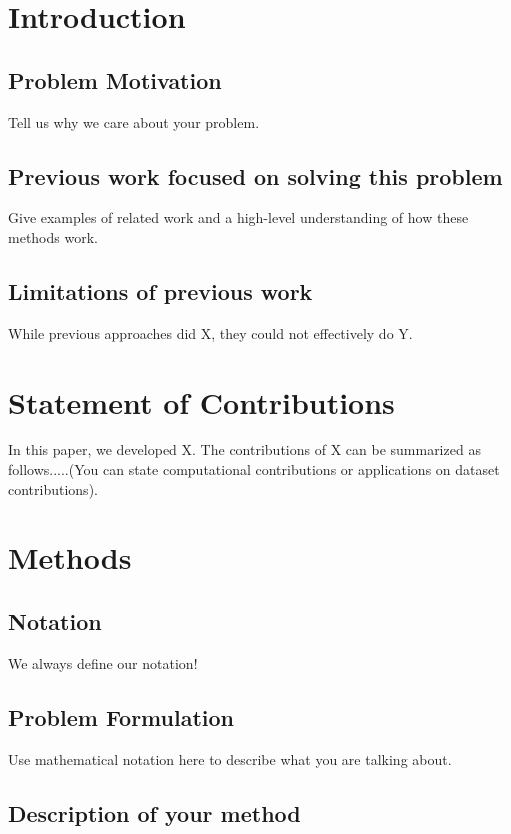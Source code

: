\documentclass{article}
\begin{document}
\section{Introduction}

\subsection{Problem Motivation}

Tell us why we care about your problem. 

\subsection{Previous work focused on solving this problem}

Give examples of related work and a high-level understanding of how these methods work.

\subsection{Limitations of previous work}

While previous approaches did X, they could not effectively do Y. 

\section{Statement of Contributions}

In this paper, we developed X. The contributions of X can be summarized as follows.....(You can state computational contributions or applications on dataset contributions). 

\section{Methods}

\subsection{Notation}

We always define our notation!

\subsection{Problem Formulation}

Use mathematical notation here to describe what you are talking about. 

\subsection{Description of your method}
\end{document}
